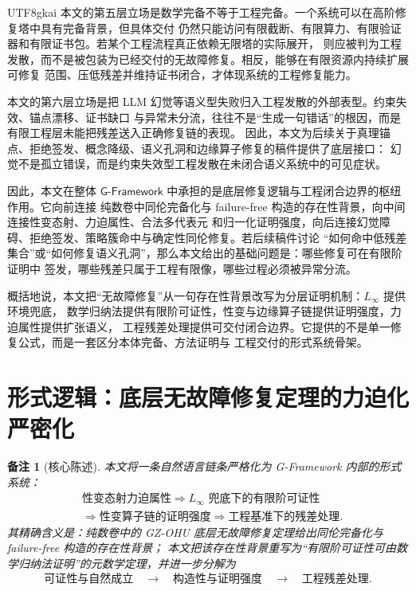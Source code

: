\documentclass[12pt]{article}
\newtheorem{remark}{备注}[section]
\newcommand{\GFramework}{\textsf{G-Framework}}
\newcommand{\Linfty}{\ensuremath{L_\infty}}
\begin{document}
\begin{CJK*}{UTF8}{gkai}
本文的第五层立场是数学完备不等于工程完备。一个系统可以在高阶修复塔中具有完备背景，但具体交付
仍然只能访问有限截断、有限算力、有限验证器和有限证书包。若某个工程流程真正依赖无限塔的实际展开，
则应被判为工程发散，而不是被包装为已经交付的无故障修复。相反，能够在有限资源内持续扩展可修复
范围、压低残差并维持证书闭合，才体现系统的工程修复能力。

本文的第六层立场是把 LLM 幻觉等语义型失败归入工程发散的外部表型。约束失效、锚点漂移、证书缺口
与异常未分流，往往不是“生成一句错话”的根因，而是有限工程层未能把残差送入正确修复链的表现。
因此，本文为后续关于真理锚点、拒绝签发、概念降级、语义孔洞和边缘算子修复的稿件提供了底层接口：
幻觉不是孤立错误，而是约束失效型工程发散在未闭合语义系统中的可见症状。

因此，本文在整体 \(\GFramework{}\) 中承担的是底层修复逻辑与工程闭合边界的枢纽作用。它向前连接
纯数卷中同伦完备化与 failure-free 构造的存在性背景，向中间连接性变态射、力迫属性、合法多代表元
和归一化证明强度，向后连接幻觉障碍、拒绝签发、策略簇命中与确定性同伦修复。若后续稿件讨论
“如何命中低残差集合”或“如何修复语义孔洞”，那么本文给出的基础问题是：哪些修复可在有限阶证明中
签发，哪些残差只属于工程有限像，哪些过程必须被异常分流。

概括地说，本文把“无故障修复”从一句存在性背景改写为分层证明机制：\(\Linfty\) 提供环境兜底，
数学归纳法提供有限阶可证性，性变与边缘算子链提供证明强度，力迫属性提供扩张语义，
工程残差处理提供可交付闭合边界。它提供的不是单一修复公式，而是一套区分本体完备、方法证明与
工程交付的形式系统骨架。

\setcounter{tocdepth}{3}
\setcounter{secnumdepth}{3}
\tableofcontents
\clearpage

\section{形式逻辑：底层无故障修复定理的力迫化严密化}
\label{sec:tex50-main}

\begin{remark}[核心陈述]
本文将一条自然语言链条严格化为 \GFramework{} 内部的形式系统：
\[
\begin{aligned}
  &\text{性变态射力迫属性}
  \Rightarrow
  \Linfty\text{ 兜底下的有限阶可证性}\\
  &\Rightarrow
  \text{性变算子链的证明强度}
  \Rightarrow
  \text{工程基准下的残差处理}.
\end{aligned}
\]
其精确含义是：纯数卷中的 GZ-OHU 底层无故障修复定理给出同伦完备化与 failure-free 构造的存在性背景；
本文把该存在性背景重写为“有限阶可证性可由数学归纳法证明”的元数学定理，并进一步分解为
\[
  \text{可证性与自然成立}
  \quad\longrightarrow\quad
  \text{构造性与证明强度}
  \quad\longrightarrow\quad
  \text{工程残差处理}.
\]
\end{remark}


\end{CJK*}
\end{document}
